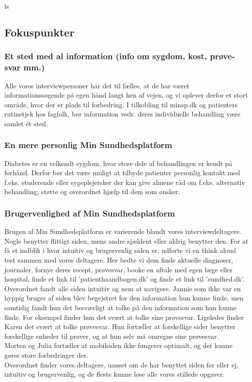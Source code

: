 ls
\subsection{Fokuspunkter}
\subsubsection{Et sted med al information (info om sygdom, kost, prøve-svar mm.)}
Alle vores interviewpersoner har det til fælles, at de har været informationssøgende på egen hånd langt hen af vejen, og vi oplever derfor et stort område, hvor der er plads til forbedring. I tilkobling til minsp.dk og patienters rutinetjek hos fagfolk, bør information vedr. deres individuelle behandling være samlet ét sted.

\subsubsection{En mere personlig Min Sundhedsplatform}
Diabetes er en velkendt sygdom, hvor store dele af behandlingen er kendt på forhånd. Derfor bør det være muligt at tilbyde patienter personlig kontakt med f.eks. studerende eller sygeplejersker der kan give almene råd om f.eks. alternativ behandling, støtte og overordnet hjælp til dem som ønsker.

\subsubsection{Brugervenlighed af Min Sundhedsplatform}
Brugen af Min Sundhedsplatform er varierende blandt vores interviewdeltagere. Nogle benytter flittigt siden, mens andre sjældent eller aldrig benytter den. For at få et indblik i hvor intuitiv og brugervenlig siden er, udførte vi en think aloud test sammen med vores deltagere. Her bedte vi dem finde aktuelle diagnoser, journaler, fornye deres recept, prøvesvar, booke en aftale med egen læge eller hospital, finde et link til 'patienthaandbogen.dk' og finde et link til 'sundhed.dk'. Overordnet fandt alle siden intuitiv og nem at navigere. Jannie som ikke var en hyppig bruger af siden blev begejstret for den information hun kunne finde, men samtidig fandt hun det besværligt at tolke på den information som hun kunne finde. For eksempel finder hun det svært at tolke sine prøvesvar. Ligeledes finder Karen det svært at tolke prøvesvar. Hun fortæller at forskellige sider benytter forskellige enheder til prøver, og at hun selv må omregne sine prøvesvar.\\
Morten og Julia fortæller at mobilsiden ikke fungerer optimalt, og der kunne gøres store forbedringer der.\\
Overordnet finder vores deltagere, uanset om de har benyttet siden før eller ej, intuitiv og brugervenlig, og de fleste kunne løse alle vores stillede opgaver.


